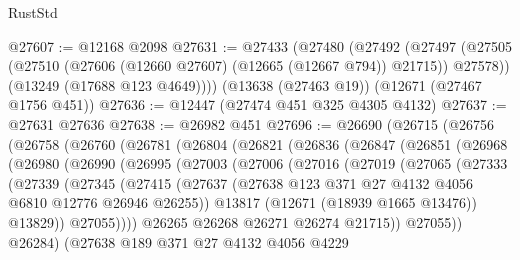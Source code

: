 \begin{lexlean}{RustStd}
\begin{coremodule}
@27607 := @12168 @2098
@27631 := @27433
    (@27480
      (@27492
        (@27497 (@27505 (@27510 (@27606 (@12660 @27607) (@12665 (@12667 @794)) @21715)) @27578))
        (@13249 (@17688 @123 @4649))))
    (@13638 (@27463 @19))
    (@12671 (@27467 @1756 @451))
@27636 := @12447 (@27474 @451 @325 @4305 @4132)
@27637 := @27631 @27636
@27638 := @26982 @451
@27696 := @26690
    (@26715
      (@26756
        (@26758
          (@26760
            (@26781
              (@26804
                (@26821
                  (@26836
                    (@26847
                      (@26851
                        (@26968
                          (@26980
                            (@26990
                              (@26995
                                (@27003
                                  (@27006
                                    (@27016
                                      (@27019
                                        (@27065
                                          (@27333
                                            (@27339
                                              (@27345
                                                (@27415
                                                  (@27637
                                                    (@27638
                                                      @123
                                                      @371
                                                      @27
                                                      @4132
                                                      @4056
                                                      @6810
                                                      @12776
                                                      @26946
                                                      @26255))
                                                  @13817
                                                  (@12671 (@18939 @1665 @13476))
                                                  @13829))
                                              @27055))))
                                      @26265
                                      @26268
                                      @26271
                                      @26274
                                      @21715))
                                  @27055))
                              @26284)
                            (@27638
                              @189
                              @371
                              @27
                              @4132
                              @4056
                              @4229

\end{coremodule}
\end{lexlean}
